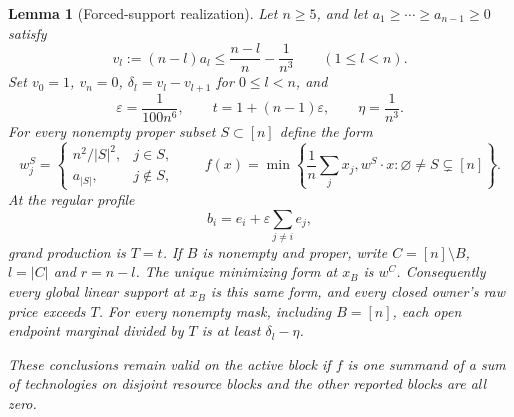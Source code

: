 \documentclass[11pt]{article}
\newtheorem{lemma}[theorem]{Lemma}
\theoremstyle{definition}\newtheorem{definition}[theorem]{Definition}
\theoremstyle{remark}\newtheorem{remark}[theorem]{Remark}
\begin{document}
\begin{lemma}[Forced-support realization]\label{arch:realization}
Let $n\ge5$, and let $a_1\ge\cdots\ge a_{n-1}\ge0$ satisfy
\begin{equation}\label{arch:gapassumption}
 v_l:=(n-l)a_l\le\frac{n-l}{n}-\frac1{n^3}
 \qquad(1\le l<n).
\end{equation}
Set $v_0=1$, $v_n=0$, $\delta_l=v_l-v_{l+1}$ for $0\le l<n$, and
\[
 \varepsilon=\frac1{100n^6},\qquad
 t=1+(n-1)\varepsilon,\qquad \eta=\frac1{n^3}.
\]
For every nonempty proper subset $S\subset[n]$ define the form
\[
 w^S_j=
 \begin{cases}n^2/|S|^2,&j\in S,\\a_{|S|},&j\notin S,
 \end{cases}
 \qquad
 f(x)=\min\left\{\frac1n\sum_jx_j,
              w^S\cdot x:\varnothing\ne S\subsetneq[n]\right\}.
\]
At the regular profile
\begin{equation}\label{arch:regularprofile}
 b_i=e_i+\varepsilon\sum_{j\ne i}e_j,
\end{equation}
grand production is $T=t$. If $B$ is nonempty and proper, write
$C=[n]\setminus B$, $l=|C|$ and $r=n-l$. The unique minimizing form at
$x_B$ is $w^C$. Consequently every global linear support at $x_B$ is
this same form, and every closed owner's raw price exceeds $T$.
For every nonempty mask, including $B=[n]$, each open endpoint marginal
divided by $T$ is at least $\delta_l-\eta$.

These conclusions remain valid on the active block if $f$ is one summand
of a sum of technologies on disjoint resource blocks and the other reported
blocks are all zero.
\end{lemma}
\end{document}
